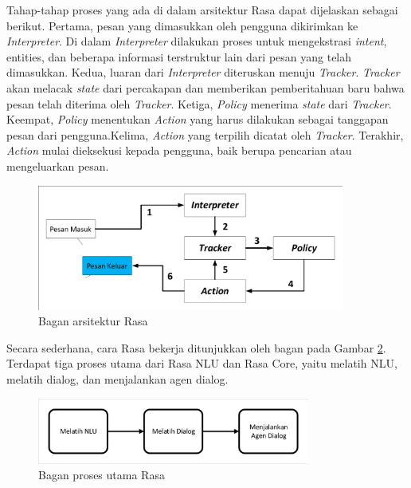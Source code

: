 Tahap-tahap proses yang ada di dalam arsitektur Rasa dapat dijelaskan sebagai berikut. Pertama, pesan yang dimasukkan oleh pengguna dikirimkan ke \textit{Interpreter}. Di dalam \textit{Interpreter} dilakukan proses untuk mengekstrasi \textit{intent}, entities, dan beberapa informasi terstruktur lain dari pesan yang telah dimasukkan. Kedua, luaran dari \textit{Interpreter} diteruskan menuju \textit{Tracker}. \textit{Tracker} akan melacak \textit{state} dari percakapan dan memberikan pemberitahuan baru bahwa pesan telah diterima oleh \textit{Tracker}. Ketiga, \textit{Policy} menerima  \textit{state} dari \textit{Tracker}. Keempat, \textit{Policy} menentukan \textit{Action} yang harus dilakukan sebagai tanggapan pesan dari pengguna.Kelima, \textit{Action} yang terpilih dicatat oleh \textit{Tracker}. Terakhir, \textit{Action} mulai dieksekusi kepada pengguna, baik berupa pencarian atau mengeluarkan pesan.

\begin{figure}[H]
	\centering
	\includegraphics[width=0.9\textwidth, trim=2 2 2 2, clip]{resources/3-rasa_arch.pdf}
	\caption{Bagan arsitektur Rasa \parencite{bocklisch2017rasa}}
	\label{fig:rasa_arch}
\end{figure}

Secara sederhana, cara Rasa bekerja ditunjukkan oleh bagan pada Gambar \ref{fig:rasa_process}. Terdapat tiga proses utama dari Rasa NLU dan Rasa Core, yaitu melatih NLU, melatih dialog, dan menjalankan agen dialog.

\begin{figure}[H]
	\centering
	\includegraphics[width=0.8\textwidth, trim=2 2 2 2, clip]{resources/3-rasa_process.pdf}
	\caption{Bagan proses utama Rasa}
	\label{fig:rasa_process}
\end{figure}

